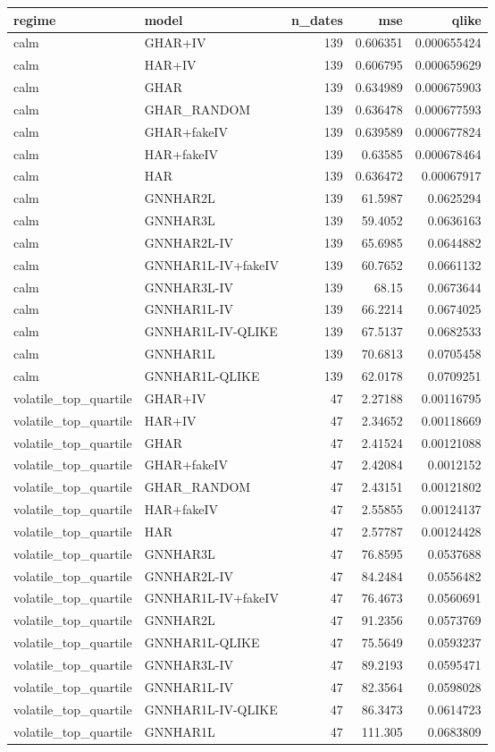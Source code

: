 \begin{tabular}{llrrr}
\toprule
regime & model & n_dates & mse & qlike \\
\midrule
calm & GHAR+IV & 139 & 0.606351 & 0.000655424 \\
calm & HAR+IV & 139 & 0.606795 & 0.000659629 \\
calm & GHAR & 139 & 0.634989 & 0.000675903 \\
calm & GHAR_RANDOM & 139 & 0.636478 & 0.000677593 \\
calm & GHAR+fakeIV & 139 & 0.639589 & 0.000677824 \\
calm & HAR+fakeIV & 139 & 0.63585 & 0.000678464 \\
calm & HAR & 139 & 0.636472 & 0.00067917 \\
calm & GNNHAR2L & 139 & 61.5987 & 0.0625294 \\
calm & GNNHAR3L & 139 & 59.4052 & 0.0636163 \\
calm & GNNHAR2L-IV & 139 & 65.6985 & 0.0644882 \\
calm & GNNHAR1L-IV+fakeIV & 139 & 60.7652 & 0.0661132 \\
calm & GNNHAR3L-IV & 139 & 68.15 & 0.0673644 \\
calm & GNNHAR1L-IV & 139 & 66.2214 & 0.0674025 \\
calm & GNNHAR1L-IV-QLIKE & 139 & 67.5137 & 0.0682533 \\
calm & GNNHAR1L & 139 & 70.6813 & 0.0705458 \\
calm & GNNHAR1L-QLIKE & 139 & 62.0178 & 0.0709251 \\
volatile_top_quartile & GHAR+IV & 47 & 2.27188 & 0.00116795 \\
volatile_top_quartile & HAR+IV & 47 & 2.34652 & 0.00118669 \\
volatile_top_quartile & GHAR & 47 & 2.41524 & 0.00121088 \\
volatile_top_quartile & GHAR+fakeIV & 47 & 2.42084 & 0.0012152 \\
volatile_top_quartile & GHAR_RANDOM & 47 & 2.43151 & 0.00121802 \\
volatile_top_quartile & HAR+fakeIV & 47 & 2.55855 & 0.00124137 \\
volatile_top_quartile & HAR & 47 & 2.57787 & 0.00124428 \\
volatile_top_quartile & GNNHAR3L & 47 & 76.8595 & 0.0537688 \\
volatile_top_quartile & GNNHAR2L-IV & 47 & 84.2484 & 0.0556482 \\
volatile_top_quartile & GNNHAR1L-IV+fakeIV & 47 & 76.4673 & 0.0560691 \\
volatile_top_quartile & GNNHAR2L & 47 & 91.2356 & 0.0573769 \\
volatile_top_quartile & GNNHAR1L-QLIKE & 47 & 75.5649 & 0.0593237 \\
volatile_top_quartile & GNNHAR3L-IV & 47 & 89.2193 & 0.0595471 \\
volatile_top_quartile & GNNHAR1L-IV & 47 & 82.3564 & 0.0598028 \\
volatile_top_quartile & GNNHAR1L-IV-QLIKE & 47 & 86.3473 & 0.0614723 \\
volatile_top_quartile & GNNHAR1L & 47 & 111.305 & 0.0683809 \\
\bottomrule
\end{tabular}
